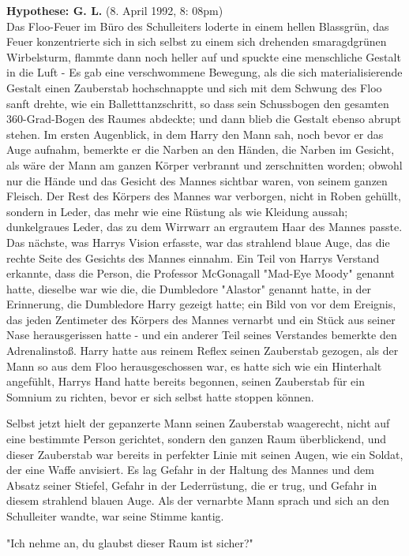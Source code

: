 {\textbf{Hypothese: G. L.} (8. April 1992, 8: 08pm)\\ Das Floo-Feuer im Büro des Schulleiters loderte in einem hellen Blassgrün, das Feuer konzentrierte sich in sich selbst zu einem sich drehenden smaragdgrünen Wirbelsturm, flammte dann noch heller auf und spuckte eine menschliche Gestalt in die Luft - Es gab eine verschwommene Bewegung, als die sich materialisierende Gestalt einen Zauberstab hochschnappte und sich mit dem Schwung des Floo sanft drehte, wie ein Balletttanzschritt, so dass sein Schussbogen den gesamten 360-Grad-Bogen des Raumes abdeckte; und dann blieb die Gestalt ebenso abrupt stehen. Im ersten Augenblick, in dem Harry den Mann sah, noch bevor er das Auge aufnahm, bemerkte er die Narben an den Händen, die Narben im Gesicht, als wäre der Mann am ganzen Körper verbrannt und zerschnitten worden; obwohl nur die Hände und das Gesicht des Mannes sichtbar waren, von seinem ganzen Fleisch. Der Rest des Körpers des Mannes war verborgen, nicht in Roben gehüllt, sondern in Leder, das mehr wie eine Rüstung als wie Kleidung aussah; dunkelgraues Leder, das zu dem Wirrwarr an ergrautem Haar des Mannes passte. Das nächste, was Harrys Vision erfasste, war das strahlend blaue Auge, das die rechte Seite des Gesichts des Mannes einnahm. Ein Teil von Harrys Verstand erkannte, dass die Person, die Professor McGonagall "Mad-Eye Moody" genannt hatte, dieselbe war wie die, die Dumbledore "Alastor" genannt hatte, in der Erinnerung, die Dumbledore Harry gezeigt hatte; ein Bild von vor dem Ereignis, das jeden Zentimeter des Körpers des Mannes vernarbt und ein Stück aus seiner Nase herausgerissen hatte - und ein anderer Teil seines Verstandes bemerkte den Adrenalinstoß. Harry hatte aus reinem Reflex seinen Zauberstab gezogen, als der Mann so aus dem Floo herausgeschossen war, es hatte sich wie ein Hinterhalt angefühlt, Harrys Hand hatte bereits begonnen, seinen Zauberstab für ein Somnium zu richten, bevor er sich selbst hatte stoppen können.

Selbst jetzt hielt der gepanzerte Mann seinen Zauberstab waagerecht, nicht auf eine bestimmte Person gerichtet, sondern den ganzen Raum überblickend, und dieser Zauberstab war bereits in perfekter Linie mit seinen Augen, wie ein Soldat, der eine Waffe anvisiert. Es lag Gefahr in der Haltung des Mannes und dem Absatz seiner Stiefel, Gefahr in der Lederrüstung, die er trug, und Gefahr in diesem strahlend blauen Auge. Als der vernarbte Mann sprach und sich an den Schulleiter wandte, war seine Stimme kantig.

"Ich nehme an, du glaubst dieser Raum ist sicher?"

}
